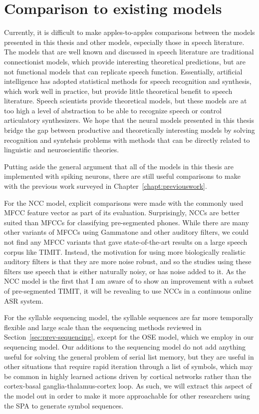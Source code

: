 \section{Comparison to existing models}

Currently, it is difficult to make
apples-to-apples comparisons between
the models presented in this thesis
and other models,
especially those in speech literature.
The models that are well known and discussed
in speech literature are traditional
connectionist models,
which provide interesting theoretical predictions,
but are not functional models
that can replicate speech function.
Essentially, artificial intelligence
has adopted statistical methods
for speech recognition and synthesis,
which work well in practice,
but provide little theoretical benefit
to speech literature.
Speech scientists provide theoretical models,
but these models are at too high
a level of abstraction to
be able to recognize speech
or control articulatory synthesizers.
We hope that the neural models presented
in this thesis bridge the gap
between productive and theoretically interesting models
by solving recognition and syntehsis problems
with methods that can be directly related
to linguistic and neuroscientific theories.

Putting aside the general argument
that all of the models in this thesis
are implemented with spiking neurons,
there are still useful comparisons
to make with the previous work
surveyed in Chapter~\ref{chapt:previouswork}.

For the NCC model, explicit comparisons were made
with the commonly used MFCC feature vector
as part of its evaluation.
Surprisingly, NCCs
are better suited than MFCCs
for classifying pre-segmented phones.
While there are many other variants of
MFCCs using Gammatone and other auditory filters,
we could not find any MFCC variants
that gave state-of-the-art results on
a large speech corpus like TIMIT.
Instead, the motivation for using
more biologically realistic
auditory filters is that
they are more noise robust,
and so the studies using these filters
use speech that is either naturally noisy,
or has noise added to it.
As the NCC model is the first
that I am aware of to show
an improvement with
a subset of pre-segmented TIMIT,
it will be revealing
to use NCCs in a
continuous online ASR system.

For the syllable sequencing model,
the syllable sequences
are far more temporally flexible
and large scale than the sequencing methods
reviewed in Section~\ref{sec:prev-sequencing},
except for the OSE model,
which we employ in our sequencing model.
Our additions to the sequencing model
do not add anything useful for
solving the general problem
of serial list memory,
but they are useful in other situations
that require rapid iteration
through a list of symbols,
which may be common
in highly learned actions
driven by cortical networks
rather than the
cortex-basal ganglia-thalamus-cortex loop.
As such, we will extract
this aspect of the model out
in order to make it more approachable
for other researchers using the SPA
to generate symbol sequences.

